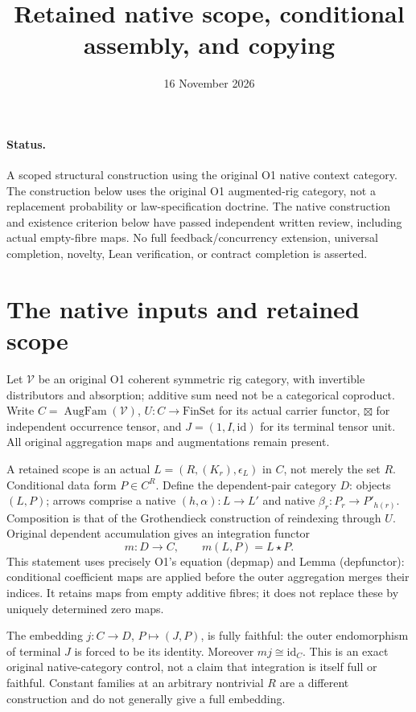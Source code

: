 \documentclass{article}
\title{Retained native scope, conditional assembly, and copying}
\date{16 November 2026}
\begin{document}
\maketitle
\paragraph{Status.} A scoped structural construction using the original O1 native context category. The construction below uses the original O1 augmented-rig category, not a replacement probability or law-specification doctrine. The native construction and existence criterion below have passed independent written review, including actual empty-fibre maps. No full feedback/concurrency extension, universal completion, novelty, Lean verification, or contract completion is asserted.

\section{The native inputs and retained scope}
Let $\mathcal V$ be an original O1 coherent symmetric rig category, with invertible distributors and absorption; additive sum need not be a categorical coproduct. Write $C=\operatorname{AugFam}(\mathcal V)$, $U:C\to\mathrm{FinSet}$ for its actual carrier functor, $\boxtimes$ for independent occurrence tensor, and $J=(1,I,\mathrm{id})$ for its terminal tensor unit. All original aggregation maps and augmentations remain present.

A retained scope is an actual $L=(R,(K_r),\epsilon_L)$ in $C$, not merely the set $R$. Conditional data form $P\in C^R$. Define the dependent-pair category $D$: objects $(L,P)$; arrows comprise a native $(h,\alpha):L\to L'$ and native $\beta_r:P_r\to P'_{h(r)}$. Composition is that of the Grothendieck construction of reindexing through $U$. Original dependent accumulation gives an integration functor
\[
 m:D\longrightarrow C,\qquad m(L,P)=L\star P.
\]
This statement uses precisely O1's equation (depmap) and Lemma (depfunctor): conditional coefficient maps are applied before the outer aggregation merges their indices. It retains maps from empty additive fibres; it does not replace these by uniquely determined zero maps.

The embedding $j:C\to D$, $P\mapsto(J,P)$, is fully faithful: the outer endomorphism of terminal $J$ is forced to be its identity. Moreover $mj\cong\mathrm{id}_C$. This is an exact original native-category control, not a claim that integration is itself full or faithful. Constant families at an arbitrary nontrivial $R$ are a different construction and do not generally give a full embedding.
\end{document}
